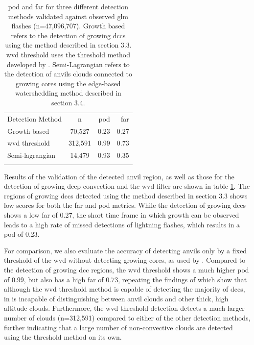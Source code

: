 \begin{table}[t]
\centering
\begin{tabular}{lcrr}
\tophline
Detection Method    & n         & \acrshort{pod}       & \acrshort{far}       \\ 
\middlehline
Growth based        & 70,527    & 0.23      & 0.27      \\
\acrshort{wvd} threshold       & 312,591   & 0.99      & 0.73      \\
Semi-lagrangian     & 14,479    & 0.93      & 0.35      \\
\bottomhline
\end{tabular}
\caption[
\acrshort{pod} and \acrshort{far}s for three different detection methods validated against observed \acrshort{glm} flashes
]{
\acrshort{pod} and \acrshort{far} for three different detection methods validated against observed \acrshort{glm} flashes (n=47,096,707). Growth based refers to the detection of growing \acrshort{dcc}s using the method described in section 3.3. \acrshort{wvd} threshold uses the threshold method developed by \citet{muller_role_2018}. Semi-Lagrangian refers to the detection of anvils clouds connected to growing cores using the edge-based watershedding method described in section 3.4.
} %
\label{table:validation}
\end{table}


Results of the validation of the detected anvil region, as well as those for the detection of growing deep convection and the \acrshort{wvd} filter are shown in table \ref{table:validation}.
The regions of growing \acrshort{dcc}s detected using the method described in section 3.3 shows low scores for both the \acrshort{far} and \acrshort{pod} metrics.
While the detection of growing \acrshort{dcc}s shows a low \acrshort{far} of 0.27, the short time frame in which growth can be observed leads to a high rate of missed detections of lightning flashes, which results in a \acrshort{pod} of 0.23.

For comparison, we also evaluate the accuracy of detecting anvils only by a fixed threshold of the \acrshort{wvd} without detecting growing cores, as used by \citet{muller_role_2018}.
Compared to the detection of growing \acrshort{dcc} regions, the \acrshort{wvd} threshold shows a much higher \acrshort{pod} of 0.99, but also has a high \acrshort{far} of 0.73, repeating the findings of \citet{muller_novel_2019} which show that although the \acrshort{wvd} threshold method is capable of detecting the majority of \acrshort{dcc}s, in is incapable of distinguishing between anvil clouds and other thick, high altitude clouds.
Furthermore, the \acrshort{wvd} threshold detection detects a much larger number of clouds (n=312,591) compared to either of the other detection methods, further indicating that a large number of non-convective clouds are detected using the threshold method on its own.

